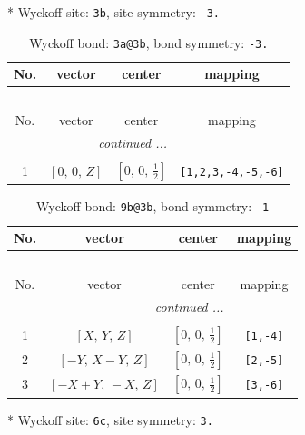 \documentclass[fleqn,8pt]{jsarticle}
\begin{document}
* Wyckoff site: {\tt 3b}, site symmetry: {\tt -3.}
\renewcommand{\arraystretch}{1.2}
\begin{longtable}{cccc}
\caption{Wyckoff bond: {\tt 3a@3b}, bond symmetry: {\tt -3.}}
 \\
 \hline \hline
No. & vector & center & mapping \\ \hline \endfirsthead

\multicolumn{3}{l}{\tablename\ \thetable{}} \\
 \hline \hline
No. & vector & center & mapping \\ \hline \endhead

 \hline \hline
\multicolumn{3}{r}{\footnotesize\it continued ...} \\ \endfoot

 \hline \hline
\multicolumn{3}{r}{} \\ \endlastfoot

1 & $\left[ 0,\, 0,\, Z \right]$ & $\left[ 0,\, 0,\, \frac{1}{2} \right]$ & {\tt [1,2,3,-4,-5,-6]} \\
\end{longtable}
\renewcommand{\arraystretch}{1.2}
\begin{longtable}{cccc}
\caption{Wyckoff bond: {\tt 9b@3b}, bond symmetry: {\tt -1}}
 \\
 \hline \hline
No. & vector & center & mapping \\ \hline \endfirsthead

\multicolumn{3}{l}{\tablename\ \thetable{}} \\
 \hline \hline
No. & vector & center & mapping \\ \hline \endhead

 \hline \hline
\multicolumn{3}{r}{\footnotesize\it continued ...} \\ \endfoot

 \hline \hline
\multicolumn{3}{r}{} \\ \endlastfoot

1 & $\left[ X,\, Y,\, Z \right]$ & $\left[ 0,\, 0,\, \frac{1}{2} \right]$ & {\tt [1,-4]} \\ \hline
2 & $\left[ - Y,\, X - Y,\, Z \right]$ & $\left[ 0,\, 0,\, \frac{1}{2} \right]$ & {\tt [2,-5]} \\ \hline
3 & $\left[ - X + Y,\, - X,\, Z \right]$ & $\left[ 0,\, 0,\, \frac{1}{2} \right]$ & {\tt [3,-6]} \\
\end{longtable}
* Wyckoff site: {\tt 6c}, site symmetry: {\tt 3.}
\renewcommand{\arraystretch}{1.2}
\end{document}
